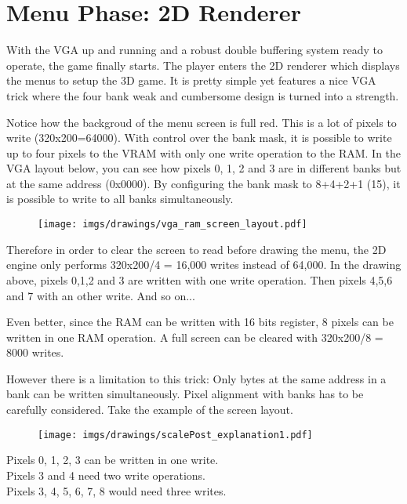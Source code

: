 \section{Menu Phase: 2D Renderer}
With the VGA up and running and a robust double buffering system ready to operate, the game finally starts. The player enters the 2D renderer which displays the menus to setup the 3D game. It is pretty simple yet features a nice VGA trick where the four bank weak and cumbersome design is turned into a strength.
\par
\begin{figure}[H]
\centering
{}
\end{figure}
\par

Notice how the backgroud of the menu screen is full red. This is a lot of pixels to write (320x200=64000). With control over the bank mask, it is possible to write up to four pixels to the VRAM with only one write operation to the RAM. In the VGA layout below, you can see how pixels 0, 1, 2 and 3 are in different banks but at the same address (0x0000). By configuring the bank mask to 8+4+2+1 (15), it is possible to write to all banks simultaneously.\\
\par
\begin{figure}[H]
\centering
\texttt{[image: imgs/drawings/vga\_ram\_screen\_layout.pdf]}
\end{figure}

\par
Therefore in order to clear the screen to read before drawing the menu, the 2D engine only performs 320x200/4 = 16,000 writes instead of 64,000. In the drawing above, pixels 0,1,2 and 3 are written with one write operation. Then pixels 4,5,6 and 7 with an other write. And so on...\\
\par
Even better, since the RAM can be written with 16 bits register, 8 pixels can be written in one RAM operation. A full screen can be cleared with 320x200/8 = 8000 writes.
\par
\begin{minipage}{\textwidth}

\end{minipage}
However there is a limitation to this trick: Only bytes at the same address in a bank can be written simultaneously. Pixel alignment with banks has to be carefully considered. Take the example of the screen layout.\
\par
\begin{figure}[H]
\centering
 \texttt{[image: imgs/drawings/scalePost\_explanation1.pdf]}
 \end{figure}
Pixels 0, 1, 2, 3 can be written in one write.\\
Pixels 3 and 4 need two write operations.\\
Pixels 3, 4, 5, 6, 7, 8 would need three writes.\\


